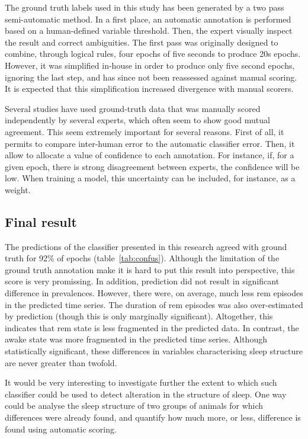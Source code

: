 The ground truth labels used in this study has been generated by a two pass semi-automatic method.
In a first place, an automatic annotation is performed based on a human-defined variable threshold.
Then, the expert visually inspect the result and correct ambiguities.
The first pass was originally designed to combine, through logical rules, four epochs of five seconds to produce 20s epochs\citationneeded{}.
However, it was simplified in-house in order to produce
only five second epochs, ignoring the last step, and has since not been reassessed against manual scoring.
It is expected that this simplification increased divergence with manual scorers.

Several studies have used ground-truth data that was manually scored independently by several experts,
which often seem to show good mutual agreement.
This seem extremely important for several reasons.
First of all, it permits to compare inter-human error to the automatic classifier error.
Then, it allow to allocate a value of confidence to each annotation.
For instance, if, for a given epoch, there is strong disagreement between experts, the confidence will be low.
When training a model, this uncertainty can be included, for instance, as a weight.

\subsection{Final result}
The predictions of the classifier presented in this research agreed with ground truth for 92\% of epochs (table~\ref{tab:confus}).
Although the limitation of the ground truth annotation make it is hard to put this result into perspective,
this score is very promissing.
In addition, prediction did not result in significant difference in prevalences.
However, there were, on average, much less \gls{rem} episodes in the predicted time series.
The duration of \gls{rem} episodes was also over-estimated by prediction (though this is only marginally significant).
Altogether, this indicates that \gls{rem} state is less fragmented in the predicted data.
In contrast, the awake state was more fragmented in the predicted time series.
Although statistically significant, these differences in variables characterising sleep structure are never greater than twofold.

It would be very interesting to investigate further the extent to which such classifier could be used to detect alteration
in the structure of sleep.
One way could be analyse the sleep structure of two groups of animals for which differences were already found, and quantify how much more, or less,
difference is found using automatic scoring.

